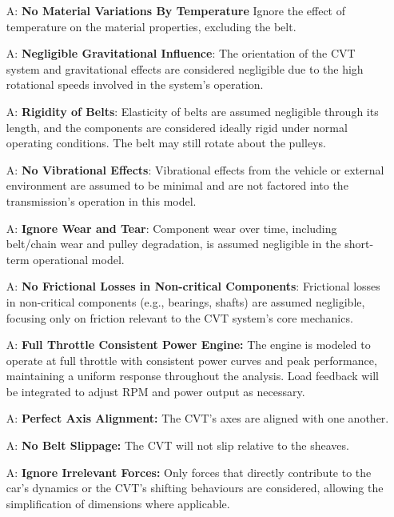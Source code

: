 \documentclass[12pt]{article}
\newcounter{assumpnum} %
\begin{document}
\begin{itemize}

\item[A\refstepcounter{assumpnum}\theassumpnum \label{A_1}:]
\textbf{No Material Variations By Temperature } Ignore the effect of temperature on the material properties, excluding the belt.

\item[A\refstepcounter{assumpnum}\theassumpnum \label{A_2}:]
\textbf{Negligible Gravitational Influence}: The orientation of the CVT system and gravitational effects are considered negligible due to the high rotational speeds involved in the system's operation.

\item[A\refstepcounter{assumpnum}\theassumpnum \label{A_3}:]
\textbf{Rigidity of Belts}: Elasticity of belts are assumed negligible through its length, and the components are considered ideally rigid under normal operating conditions. The belt may still rotate about the pulleys.

\item[A\refstepcounter{assumpnum}\theassumpnum \label{A_4}:]
\textbf{No Vibrational Effects}: Vibrational effects from the vehicle or external environment are assumed to be minimal and are not factored into the transmission’s operation in this model.

\item[A\refstepcounter{assumpnum}\theassumpnum \label{A_5}:]
\textbf{Ignore Wear and Tear}: Component wear over time, including belt/chain wear and pulley degradation, is assumed negligible in the short-term operational model.

\item[A\refstepcounter{assumpnum}\theassumpnum \label{A_6}:]
\textbf{No Frictional Losses in Non-critical Components}: Frictional losses in non-critical components (e.g., bearings, shafts) are assumed negligible, focusing only on friction relevant to the CVT system's core mechanics.

\item[A\refstepcounter{assumpnum}\theassumpnum \label{A_7}:]
\textbf{Full Throttle Consistent Power Engine:} The engine is modeled to operate at full throttle with consistent power curves and peak performance, maintaining a uniform response throughout the analysis. Load feedback will be integrated to adjust RPM and power output as necessary.

\item[A\refstepcounter{assumpnum}\theassumpnum \label{A_8}:]
\textbf{Perfect Axis Alignment:} The CVT's axes are aligned with one another.

\item[A\refstepcounter{assumpnum}\theassumpnum \label{A_9}:]
\textbf{No Belt Slippage:} The CVT will not slip relative to the sheaves.

\item[A\refstepcounter{assumpnum}\theassumpnum \label{A_10}:]
\textbf{Ignore Irrelevant Forces:} Only forces that directly contribute to the car's dynamics or the CVT's shifting behaviours are considered, allowing the simplification of dimensions where applicable.

\end{itemize}
\end{document}
